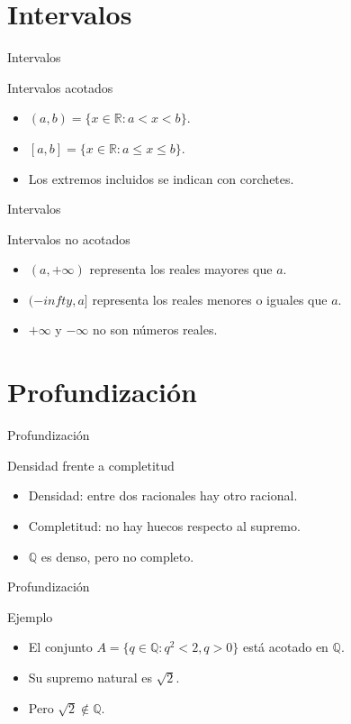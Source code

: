 \documentclass[aspectratio=169,11pt]{beamer}
\begin{document}
\section{Intervalos}

\begin{frame}{Intervalos}
\begin{block}{Intervalos acotados}
\begin{itemize}
  \item \((a,b)=\{x\in\mathbb{R}:a<x<b\}\).
  \item \([a,b]=\{x\in\mathbb{R}:a\leq x\leq b\}\).
  \item Los extremos incluidos se indican con corchetes.
\end{itemize}
\end{block}
\end{frame}

\begin{frame}{Intervalos}
\begin{block}{Intervalos no acotados}
\begin{itemize}
  \item \((a,+\infty)\) representa los reales mayores que \(a\).
  \item \((-infty,a]\) representa los reales menores o iguales que \(a\).
  \item \(+\infty\) y \(-\infty\) no son números reales.
\end{itemize}
\end{block}
\end{frame}

\section{Profundización}

\begin{frame}{Profundización}
\begin{block}{Densidad frente a completitud}
\begin{itemize}
  \item Densidad: entre dos racionales hay otro racional.
  \item Completitud: no hay huecos respecto al supremo.
  \item \(\mathbb{Q}\) es denso, pero no completo.
\end{itemize}
\end{block}
\end{frame}

\begin{frame}{Profundización}
\begin{block}{Ejemplo}
\begin{itemize}
  \item El conjunto \(A=\{q\in\mathbb{Q}:q^2<2, q>0\}\) está acotado en \(\mathbb{Q}\).
  \item Su supremo natural es \(\sqrt{2}\).
  \item Pero \(\sqrt{2}\notin\mathbb{Q}\).
\end{itemize}
\end{block}
\end{frame}
\end{document}
